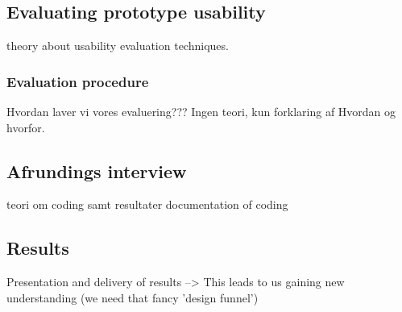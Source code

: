 \subsection{Evaluating prototype usability}
theory about usability evaluation techniques.
\subsubsection*{Evaluation procedure}
Hvordan laver vi vores evaluering??? Ingen teori, kun forklaring af Hvordan og hvorfor. 
\subsection{Afrundings interview}
teori om coding samt resultater documentation of coding
\subsection{Results}
Presentation and delivery of results --> This leads to us gaining new understanding (we need that fancy 'design funnel')